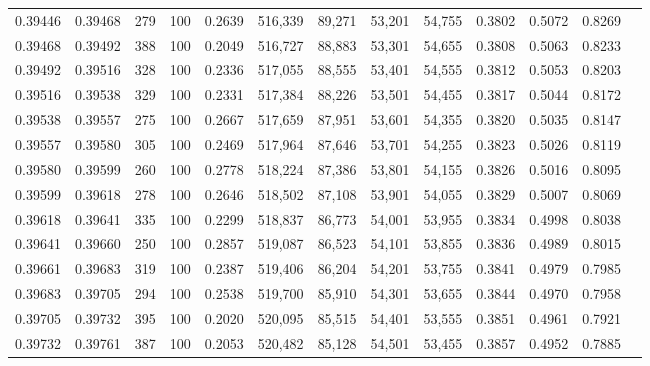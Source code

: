 \begin{tabular}{rrrrrrrrrrrrr}
0.39446 & 0.39468 &    279 & 100 &                                     0.2639 & 516,339 &  89,271 &  53,201 &  54,755 & 0.3802 & 0.5072 & 0.8269 \\
0.39468 & 0.39492 &    388 & 100 &                                     0.2049 & 516,727 &  88,883 &  53,301 &  54,655 & 0.3808 & 0.5063 & 0.8233 \\
0.39492 & 0.39516 &    328 & 100 &                                     0.2336 & 517,055 &  88,555 &  53,401 &  54,555 & 0.3812 & 0.5053 & 0.8203 \\
0.39516 & 0.39538 &    329 & 100 &                                     0.2331 & 517,384 &  88,226 &  53,501 &  54,455 & 0.3817 & 0.5044 & 0.8172 \\
0.39538 & 0.39557 &    275 & 100 &                                     0.2667 & 517,659 &  87,951 &  53,601 &  54,355 & 0.3820 & 0.5035 & 0.8147 \\
0.39557 & 0.39580 &    305 & 100 &                                     0.2469 & 517,964 &  87,646 &  53,701 &  54,255 & 0.3823 & 0.5026 & 0.8119 \\
0.39580 & 0.39599 &    260 & 100 &                                     0.2778 & 518,224 &  87,386 &  53,801 &  54,155 & 0.3826 & 0.5016 & 0.8095 \\
0.39599 & 0.39618 &    278 & 100 &                                     0.2646 & 518,502 &  87,108 &  53,901 &  54,055 & 0.3829 & 0.5007 & 0.8069 \\
0.39618 & 0.39641 &    335 & 100 &                                     0.2299 & 518,837 &  86,773 &  54,001 &  53,955 & 0.3834 & 0.4998 & 0.8038 \\
0.39641 & 0.39660 &    250 & 100 &                                     0.2857 & 519,087 &  86,523 &  54,101 &  53,855 & 0.3836 & 0.4989 & 0.8015 \\
0.39661 & 0.39683 &    319 & 100 &                                     0.2387 & 519,406 &  86,204 &  54,201 &  53,755 & 0.3841 & 0.4979 & 0.7985 \\
0.39683 & 0.39705 &    294 & 100 &                                     0.2538 & 519,700 &  85,910 &  54,301 &  53,655 & 0.3844 & 0.4970 & 0.7958 \\
0.39705 & 0.39732 &    395 & 100 &                                     0.2020 & 520,095 &  85,515 &  54,401 &  53,555 & 0.3851 & 0.4961 & 0.7921 \\
0.39732 & 0.39761 &    387 & 100 &                                     0.2053 & 520,482 &  85,128 &  54,501 &  53,455 & 0.3857 & 0.4952 & 0.7885 \\

\end{tabular}
